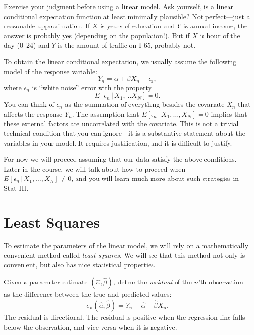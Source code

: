 \documentclass[
  12pt,
  oneside,openany]{book}
\begin{document}
Exercise your judgment before using a linear model. Ask yourself, is a linear conditional expectation function at least minimally plausible? Not perfect---just a reasonable approximation. If \(X\) is years of education and \(Y\) is annual income, the answer is probably yes (depending on the population!). But if \(X\) is hour of the day (0--24) and \(Y\) is the amount of traffic on I-65, probably not.

To obtain the linear conditional expectation, we usually assume the following model of the response variable:
\begin{equation}
Y_n = \alpha + \beta X_n + \epsilon_n,
\end{equation}
where \(\epsilon_n\) is ``white noise'' error with the property
\begin{equation}
E[\epsilon_n \,|\, X_1, \ldots X_N] = 0.
\end{equation}
You can think of \(\epsilon_n\) as the summation of everything besides the covariate \(X_n\) that affects the response \(Y_n\). The assumption that \(E[\epsilon_n \,|\, X_1, \ldots, X_N] = 0\) implies that these external factors are uncorrelated with the covariate. This is not a trivial technical condition that you can ignore---it is a substantive statement about the variables in your model. It requires justification, and it is difficult to justify.

For now we will proceed assuming that our data satisfy the above conditions. Later in the course, we will talk about how to proceed when \(E[\epsilon_n \,|\, X_1, \ldots, X_N] \neq 0\), and you will learn much more about such strategies in Stat III.

\hypertarget{least-squares}{%
\section{Least Squares}\label{least-squares}}

To estimate the parameters of the linear model, we will rely on a mathematically convenient method called \emph{least squares}. We will see that this method not only is convenient, but also has nice statistical properties.

Given a parameter estimate \((\hat{\alpha}, \hat{\beta})\), define the \emph{residual} of the \(n\)'th observation as the difference between the true and predicted values:
\begin{equation}
e_n(\hat{\alpha}, \hat{\beta}) = Y_n - \hat{\alpha} - \hat{\beta} X_n.
\end{equation}
The residual is directional. The residual is positive when the regression line falls below the observation, and vice versa when it is negative.
\end{document}
